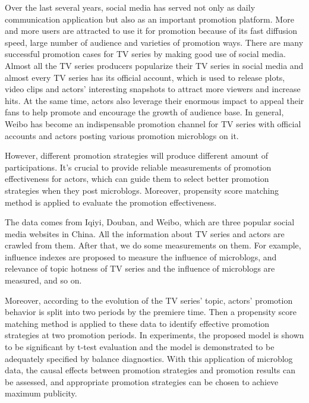 
\begin{eabstract}

Over the last several years, social media has served not only as daily communication application but also as an important promotion platform. More and more users are attracted to use it for promotion because of its fast diffusion speed, large number of audience and varieties of promotion ways. There are many successful promotion cases for TV series by making good use of social media. Almost all the TV series producers popularize their TV series in social media and almost every TV series has its official account, which is used to release plots, video clips and actors’ interesting snapshots to attract more viewers and increase hits. At the same time, actors also leverage their enormous impact to appeal their fans to help promote and encourage the growth of audience base. In general, Weibo has become an indispensable promotion channel for TV series with official accounts and actors posting various promotion microblogs on it.

However, different promotion strategies will produce different amount of participations. It's crucial to provide reliable measurements of promotion effectiveness for actors, which can guide them to select better promotion strategies when they post microblogs. Moreover, propensity score matching method is applied to evaluate the promotion effectiveness. 

The data comes from Iqiyi, Douban, and Weibo, which are three popular social media websites in China. All the information about TV series and actors are crawled from them. After that, we do some measurements on them. For example, influence indexes are proposed to measure the influence of microblogs, and relevance of topic hotness of TV series and the influence of microblogs are measured, and so on. 

Moreover, according to the evolution of the TV series' topic, actors' promotion behavior is split into two periods by the premiere time. Then a propensity score matching method is applied to these data to identify effective promotion strategies at two promotion periods. In experiments, the proposed model is shown to be significant by t-test evaluation and the model is demonstrated to be adequately specified by balance diagnostics. With this application of microblog data, the causal effects between promotion strategies and promotion results can be assessed, and appropriate promotion strategies can be chosen to achieve maximum publicity.


\end{eabstract}




































